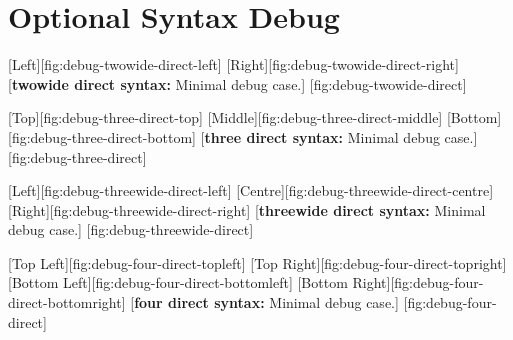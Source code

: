 \documentclass[12pt,letterpaper]{article}
\begin{document}
\section*{Optional Syntax Debug}

\figfloat
    {
        \figtwowide
        {[Left][fig:debug-twowide-direct-left]}
        {[Right][fig:debug-twowide-direct-right]}
    }
    [\textbf{twowide direct syntax:} Minimal debug case.]
    [fig:debug-twowide-direct]

\figfloat
    {
        \figthree
        {[Top][fig:debug-three-direct-top]}
        {[Middle][fig:debug-three-direct-middle]}
        {[Bottom][fig:debug-three-direct-bottom]}
    }
    [\textbf{three direct syntax:} Minimal debug case.]
    [fig:debug-three-direct]

\figfloat
    {
        \figthreewide
        {[Left][fig:debug-threewide-direct-left]}
        {[Centre][fig:debug-threewide-direct-centre]}
        {[Right][fig:debug-threewide-direct-right]}
    }
    [\textbf{threewide direct syntax:} Minimal debug case.]
    [fig:debug-threewide-direct]

\figfloat
    {
        \figfour
        {[Top Left][fig:debug-four-direct-topleft]}
        {[Top Right][fig:debug-four-direct-topright]}
        {[Bottom Left][fig:debug-four-direct-bottomleft]}
        {[Bottom Right][fig:debug-four-direct-bottomright]}
    }
    [\textbf{four direct syntax:} Minimal debug case.]
    [fig:debug-four-direct]
\end{document}
